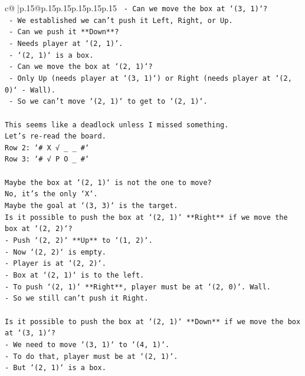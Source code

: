 \documentclass{article}
\begin{document}
{\begin{supertabular}{c@{$\;$}|p{.15\linewidth}@{}p{.15\linewidth}p{.15\linewidth}p{.15\linewidth}p{.15\linewidth}p{.15\linewidth}}
{{{\texttt{  {-} Can we move the box at `(3, 1)`?} \\
\texttt{    {-} We established we can't push it Left, Right, or Up.} \\
\texttt{    {-} Can we push it **Down**?} \\
\texttt{      {-} Needs player at `(2, 1)`.} \\
\texttt{      {-} `(2, 1)` is a box.} \\
\texttt{      {-} Can we move the box at `(2, 1)`?} \\
\texttt{        {-} Only Up (needs player at `(3, 1)`) or Right (needs player at `(2, 0)` {-} Wall).} \\
\texttt{        {-} So we can't move `(2, 1)` to get to `(2, 1)`.} \\
\\ 
\texttt{This seems like a deadlock unless I missed something.} \\
\texttt{Let's re{-}read the board.} \\
\texttt{Row 2: `\# X √ \_ \_ \#`} \\
\texttt{Row 3: `\# √ P O \_ \#`} \\
\\ 
\texttt{Maybe the box at `(2, 1)` is not the one to move?} \\
\texttt{No, it's the only `X`.} \\
\texttt{Maybe the goal at `(3, 3)` is the target.} \\
\texttt{Is it possible to push the box at `(2, 1)` **Right** if we move the box at `(2, 2)`?} \\
\texttt{{-} Push `(2, 2)` **Up** to `(1, 2)`.} \\
\texttt{{-} Now `(2, 2)` is empty.} \\
\texttt{{-} Player is at `(2, 2)`.} \\
\texttt{{-} Box at `(2, 1)` is to the left.} \\
\texttt{{-} To push `(2, 1)` **Right**, player must be at `(2, 0)`. Wall.} \\
\texttt{{-} So we still can't push it Right.} \\
\\ 
\texttt{Is it possible to push the box at `(2, 1)` **Down** if we move the box at `(3, 1)`?} \\
\texttt{{-} We need to move `(3, 1)` to `(4, 1)`.} \\
\texttt{{-} To do that, player must be at `(2, 1)`.} \\
\texttt{{-} But `(2, 1)` is a box.} \\
}}}
\end{supertabular}}
\end{document}
